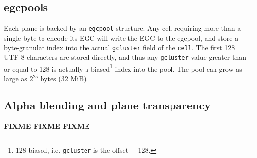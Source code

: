 \subsection{egcpools}
\label{sec:egcpools}
Each plane is backed by an \texttt{egcpool} structure. Any cell requiring more
than a single byte to encode its EGC will write the EGC to the egcpool, and
store a byte-granular index into the actual \texttt{gcluster} field of the
\texttt{cell}. The first 128 UTF-8 characters are stored directly, and thus
any \texttt{gcluster} value greater than or equal to 128 is actually a
biased\footnote{128-biased, i.e. \texttt{gcluster} is the offset + 128.}
index into the pool. The pool can grow as large as $2^{25}$ bytes (32 MiB).

\subsection{Alpha blending and plane transparency}
\label{sec:alpha}
\textbf{FIXME FIXME FIXME}

